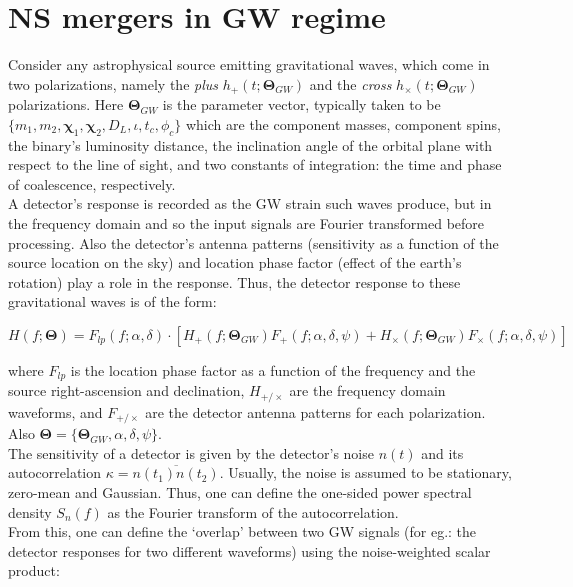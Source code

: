 \section{NS mergers in GW regime}
    \label{sec:ns_in_gw}

    Consider any astrophysical source emitting gravitational waves, which come in two
    polarizations, namely the \emph{plus} $h_{+}(t; \mathbf{\Theta}_{GW})$ and the
    \emph{cross} $h_{\times}(t; \mathbf{\Theta}_{GW})$ polarizations. Here
    $\mathbf{\Theta}_{GW}$ is the parameter vector, typically taken to be $\{m_1, m_2,
    \mathbf{\chi}_1, \mathbf{\chi}_2, D_L, \iota, t_c, \phi_c\}$ which are the component
    masses, component spins, the binary's luminosity distance, the inclination angle
    of the orbital plane with respect to the line of sight, and two constants of
    integration: the time and phase of coalescence, respectively.\\
    A detector's response is recorded as the GW strain such waves produce, but in the
    frequency domain and so the input signals are Fourier transformed before processing.
    Also the detector's antenna patterns (sensitivity as a function of the source
    location on the sky) and location phase factor (effect of the earth's rotation) play
    a role in the response. Thus, the detector response to these gravitational waves is
    of the form:

    \begin{equation}
        H(f; \mathbf{\Theta}) =
            F_{lp}(f; \alpha, \delta) \cdot
            [
                H_{+}(f; \mathbf{\Theta}_{GW}) F_{+}(f; \alpha, \delta, \psi) +
                H_{\times}(f; \mathbf{\Theta}_{GW}) F_{\times}(f; \alpha, \delta, \psi)
            ]
    \end{equation}

    where $F_{lp}$ is the location phase factor as a function of the frequency and the
    source right-ascension and declination, $H_{+/\times}$ are the frequency domain
    waveforms, and $F_{+/\times}$ are the detector antenna patterns for each
    polarization. Also $\mathbf{\Theta} = \{\mathbf{\Theta}_{GW}, \alpha, \delta,
    \psi\}$.\\ The sensitivity of a detector is given by the detector's noise $n(t)$ and
    its autocorrelation $\kappa = \overline{n(t_1)n(t_2)}$. Usually, the noise is
    assumed to be stationary, zero-mean and Gaussian. Thus, one can define the one-sided
    power spectral density $S_n(f)$ as the Fourier transform of the autocorrelation.\\
    From this, one can define the `overlap' between two GW signals (for eg.: the
    detector responses for two different waveforms) using the noise-weighted scalar
    product:

